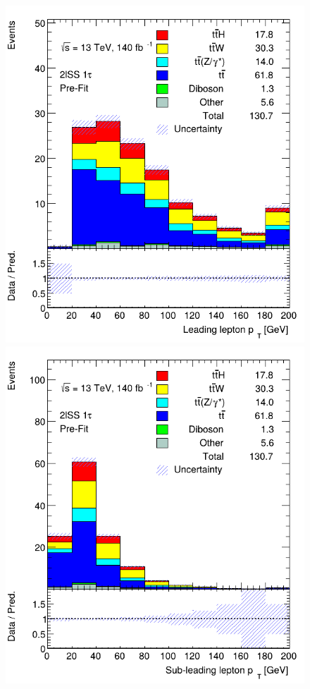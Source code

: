 \begin{figure}[ht!]
    \centering
    
    \includegraphics[scale=0.25]{res/AnalysisPlots/lep-pt-0.png}
    \includegraphics[scale=0.25]{res/AnalysisPlots/lep-pt-1.png}

\end{figure}
